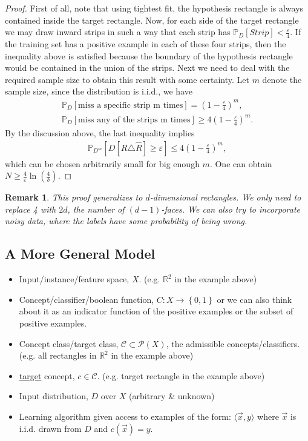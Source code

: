 \documentclass[12pt, letterpaper]{article}
\numberwithin{equation}{section} %
\newcommand{\R}{\mathbb{R}}
\newcommand{\ul}{\underline}
\newcommand{\mb}{\mathbb}
\newcommand{\mc}{\mathcal}
\newcommand{\ve}{\varepsilon}
\newtheorem{remark}[theorem]{Remark}
\theoremstyle{definition}
\theoremstyle{remark}
\begin{document}
\begin{proof}
	First of all, note that using tightest fit, the hypothesis rectangle is always contained inside the target rectangle. 
	Now, for each side of the target rectangle we may draw inward strips in such a way that each strip has $\mb P_D[Strip] < \frac{\ve}{4}$. 
	If the training set has a positive example in each of these four strips, then the inequality above is satisfied because the boundary of the hypothesis rectangle would be contained in the union of the strips. 
	Next we need to deal with the required sample size to obtain this result with some certainty. 
	Let $m$ denote the sample size, since the distribution is i.i.d., we have
	\begin{align*}
		\mb P_D[\textrm{miss a specific strip m times}] = \left(1-\frac{\ve}{4}\right)^m,\\
		\mb P_D[\textrm{miss any of the strips m times}] \geq 4\left(1-\frac{\ve}{4}\right)^m.
	\end{align*}
	By the discussion above, the last inequality implies
	\begin{align*}
		\mb P_{D^m}[D[R\triangle\hat R]\geq \ve] \leq 4\left(1-\frac{\ve}{4}\right)^m,
	\end{align*}
	which can be chosen arbitrarily small for big enough $m$. 
	One can obtain $N\geq \frac4\ve \ln\left(\frac4\delta\right)$.
\end{proof}

\begin{remark}
	This proof generalizes to $d$-dimensional rectangles. 
	We only need to replace 4 with $2d$, the number of $(d-1)$-faces.
	We can also try to incorporate noisy data, where the labels have some probability of being wrong.
\end{remark}


\subsection{A More General Model}

\begin{itemize}
	\item Input/instance/feature space, $X$. (e.g. $\R^2$ in the example above)
	\item Concept/classifier/boolean function, $C: X \rightarrow \left\{0,1\right\}$ or we can also think about it as an indicator function of the positive examples or the subset of positive examples.
	\item Concept class/target class, $\mc C \subset \mc P(X)$, the admissible concepts/classifiers. (e.g. all rectangles in $\R^2$ in the example above)
	\item \ul{target} concept, $c\in\mc C$. (e.g. target rectangle in the example above)
	\item Input distribution, $D$ over $X$ (arbitrary \& unknown)
	\item Learning algorithm given access to examples of the form: $\langle \vec x,y \rangle$ where $\vec x$ is i.i.d. drawn from $D$ and $c(\vec x) = y$.
\end{itemize}
\end{document}
